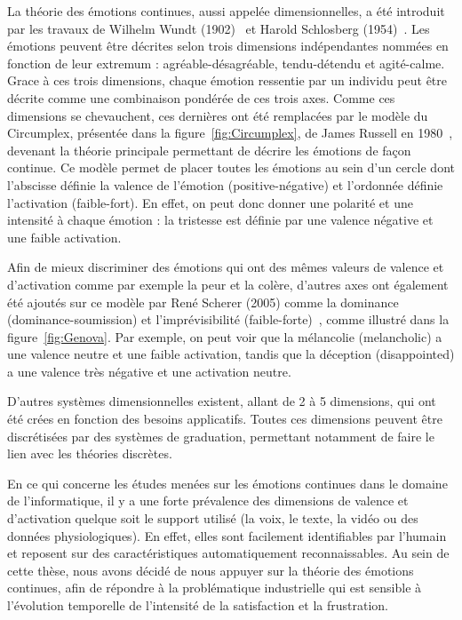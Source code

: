 La théorie des émotions continues, aussi appelée dimensionnelles, a été introduit par les travaux de Wilhelm Wundt (1902)~\cite{Wundt1902} et Harold Schlosberg (1954)~\cite{Schlosberg1954}. Les émotions peuvent être décrites selon trois dimensions indépendantes nommées en fonction de leur extremum : agréable-désagréable, tendu-détendu et agité-calme. Grace à ces trois dimensions, chaque émotion ressentie par un individu peut être décrite comme une combinaison pondérée de ces trois axes.  Comme ces dimensions se chevauchent, ces dernières ont été remplacées par le modèle du Circumplex, présentée dans la figure~\ref{fig:Circumplex}, de James Russell en 1980~\cite{Russell1980}, devenant la théorie principale permettant de décrire les émotions de façon continue. Ce modèle permet de placer toutes les émotions au sein d'un cercle dont l'abscisse définie la valence de l'émotion (positive-négative) et l'ordonnée définie l'activation (faible-fort). En effet, on peut donc donner une polarité et une intensité à chaque émotion : la tristesse est définie par une valence négative et une faible activation.



Afin de mieux discriminer des émotions qui ont des mêmes valeurs de valence et d'activation comme par exemple la peur et la colère, d'autres axes ont également été ajoutés sur ce modèle par René Scherer (2005) comme la dominance (dominance-soumission) et l'imprévisibilité (faible-forte)~\cite{Scherer2005}, comme illustré dans la figure~\ref{fig:Genova}. Par exemple, on peut voir que la mélancolie (melancholic) a une valence neutre et une faible activation, tandis que la déception (disappointed) a une valence très négative et une activation neutre.


D'autres systèmes dimensionnelles existent, allant de 2 à 5 dimensions, qui ont été crées en fonction des besoins applicatifs. Toutes ces dimensions peuvent être discrétisées par des systèmes de graduation, permettant notamment de faire le lien avec les théories discrètes.

En ce qui concerne les études menées sur les émotions continues dans le domaine de l'informatique, il y a une forte prévalence des dimensions de valence et d'activation quelque soit le support utilisé (la voix, le texte, la vidéo ou des données physiologiques). En effet, elles sont facilement identifiables par l'humain et reposent sur des caractéristiques automatiquement reconnaissables. Au sein de cette thèse, nous avons décidé de nous appuyer sur la théorie des émotions continues, afin de répondre à la problématique industrielle qui est sensible à l'évolution temporelle de l'intensité de la satisfaction et la frustration.


